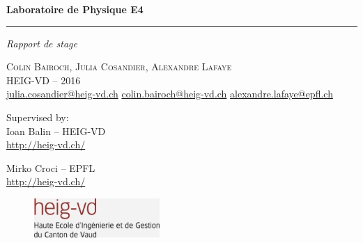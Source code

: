 \documentclass[a4paper,french,twoside,10pt]{report}
\newcommand{\titleinfo}{Laboratoire de Physique E4}
\begin{document}
\begin{titlepage}
    \null\vfil
    \begin{flushleft}
	\begin{center}
	    \Huge \textbf{\titleinfo}
	\end{center}
    \end{flushleft}
    \par
    \hrule height 4pt
    \par
    \begin{flushright}
	\large
	\textsl{Rapport de stage} \par
    \end{flushright}
    \vspace{\fill}

    \begin{center}
	\Large
	\textsc{Colin Bairoch, Julia Cosandier, Alexandre Lafaye\\
	HEIG-VD -- 2016} \\
	\href{mailto:julia.cosandier@heig-vd.ch}{julia.cosandier@heig-vd.ch}
	\href{mailto:colin.bairoch@heig-vd.ch}{colin.bairoch@heig-vd.ch}
	\href{mailto:alexandre.lafaye@epfl.ch}{alexandre.lafaye@epfl.ch}
    \end{center}
    \vspace{\fill}
    \begin{center}
	\large
	Supervised by: \\
	\vspace{\fill}
	Ioan Balin -- HEIG-VD\\
	\href{http://heig-vd.ch/}{http://heig-vd.ch/} \\
    \end{center}
    \begin{center}
	\large
	Mirko Croci -- EPFL \\
	\href{http://heig-vd.ch/}{http://heig-vd.ch/} \\
    \end{center}

    \vspace{\fill}

    \begin{figure}[!h]
	\centering
	\parbox{1.4in}{
	\includegraphics[height=4em]{logo_heig_h80.jpg}}
    \end{figure}

    \vspace*{1cm}
\end{titlepage}
\end{document}
